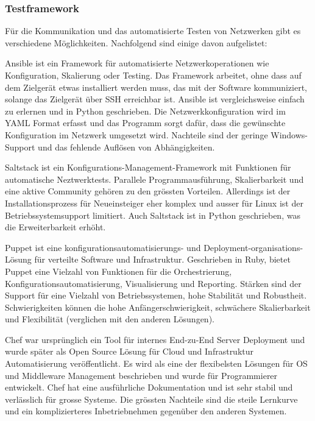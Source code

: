 \documentclass[
	ngerman,
	toc=listof, %
	toc=bibliography, %
	footnotes=multiple, %
	parskip=half, %
	numbers=noendperiod %
]{scrartcl}
\begin{document}
		\newpage

		\subsubsection{Testframework}
		Für die Kommunikation und das automatisierte Testen von Netzwerken gibt es verschiedene Möglichkeiten.
		Nachfolgend sind einige davon aufgelistet:
		
		Ansible ist ein Framework für automatisierte Netzwerkoperationen wie Konfiguration, Skalierung oder Testing.
		Das Framework arbeitet, ohne dass auf dem Zielgerät etwas installiert werden muss, das mit der Software kommuniziert, solange das Zielgerät über SSH erreichbar ist.
		Ansible ist vergleichsweise einfach zu erlernen und in Python geschrieben.
		Die Netzwerkkonfiguration wird im YAML Format erfasst und das Programm sorgt dafür, dass die gewünschte Konfiguration im Netzwerk umgesetzt wird.
		Nachteile sind der geringe Windows-Support und das fehlende Auflösen von Abhängigkeiten.

		Saltstack ist ein Konfigurations-Management-Framework mit Funktionen für automatische Neztwerktests.
		Parallele Programmausführung, Skalierbarkeit und eine aktive Community gehören zu den grössten Vorteilen.
		Allerdings ist der Installationsprozess für Neueinsteiger eher komplex und ausser für Linux ist der Betriebssystemsupport limitiert.
		Auch Saltstack ist in Python geschrieben, was die Erweiterbarkeit erhöht.
		
		Puppet ist eine konfigurationsautomatisierungs- und Deployment-organisations-Lösung für verteilte Software und Infrastruktur.
		Geschrieben in Ruby, bietet Puppet eine Vielzahl von Funktionen für die Orchestrierung, Konfigurationsautomatisierung, Visualisierung und Reporting.
		Stärken sind der Support für eine Vielzahl von Betriebssystemen, hohe Stabilität und Robustheit.
		Schwierigkeiten können die hohe Anfängerschwierigkeit, schwächere Skalierbarkeit und Flexibilität (verglichen mit den anderen Lösungen).

		Chef war ursprünglich ein Tool für internes End-zu-End Server Deployment und wurde später als Open Source Lösung für Cloud und Infrastruktur Automatisierung veröffentlicht.
		Es wird als eine der flexibelsten Lösungen für OS und Middleware Management beschrieben und wurde für Programmierer entwickelt.
		Chef hat eine ausführliche Dokumentation und ist sehr stabil und verlässlich für grosse Systeme.
		Die grössten Nachteile sind die steile Lernkurve und ein komplizierteres Inbetriebnehmen gegenüber den anderen Systemen.
\end{document}
